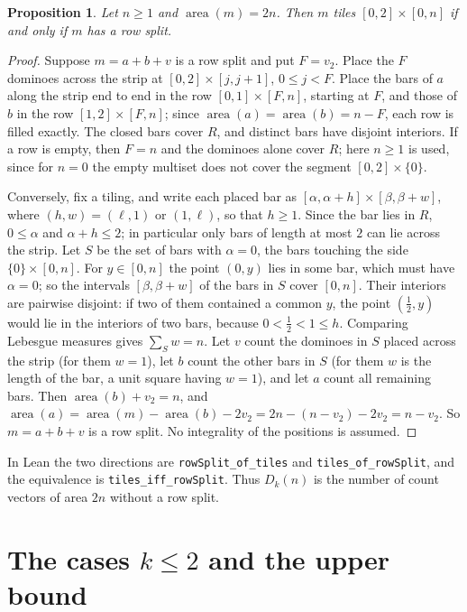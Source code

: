 \documentclass[11pt]{article}
\newtheorem{proposition}{Proposition}
\theoremstyle{definition}
\theoremstyle{remark}
\newcommand{\area}{\operatorname{area}}
\begin{document}
\begin{proposition}\label{prop:criterion}
Let $n\ge1$ and $\area(m)=2n$. Then $m$ tiles $[0,2]\times[0,n]$ if and only
if $m$ has a row split.
\end{proposition}

\begin{proof}
Suppose $m=a+b+v$ is a row split and put $F=v_2$. Place the $F$ dominoes
across the strip at $[0,2]\times[j,j+1]$, $0\le j<F$. Place the bars of $a$
along the strip end to end in the row $[0,1]\times[F,n]$, starting at $F$, and
those of $b$ in the row $[1,2]\times[F,n]$; since $\area(a)=\area(b)=n-F$,
each row is filled exactly. The closed bars cover $R$, and distinct bars have
disjoint interiors. If a row is empty, then $F=n$ and the dominoes alone cover
$R$; here $n\ge1$ is used, since for $n=0$ the empty multiset does not cover
the segment $[0,2]\times\{0\}$.

Conversely, fix a tiling, and write each placed bar as
$[\alpha,\alpha+h]\times[\beta,\beta+w]$, where $(h,w)=(\ell,1)$ or $(1,\ell)$,
so that $h\ge1$. Since the bar lies in $R$, $0\le\alpha$ and $\alpha+h\le2$;
in particular only bars of length at most $2$ can lie across the strip. Let
$S$ be the set of bars with $\alpha=0$, the bars touching the side
$\{0\}\times[0,n]$. For $y\in[0,n]$ the point $(0,y)$ lies in some bar, which
must have $\alpha=0$; so the intervals $[\beta,\beta+w]$ of the bars in $S$
cover $[0,n]$. Their interiors are pairwise disjoint: if two of them contained
a common $y$, the point $(\frac12,y)$ would lie in the interiors of two bars,
because $0<\frac12<1\le h$. Comparing Lebesgue measures gives
$\sum_{S}w=n$. Let $v$ count the dominoes in $S$ placed across the strip (for
them $w=1$), let $b$ count the other bars in $S$ (for them $w$ is the length
of the bar, a unit square having $w=1$), and let $a$ count all remaining bars.
Then $\area(b)+v_2=n$, and
$\area(a)=\area(m)-\area(b)-2v_2=2n-(n-v_2)-2v_2=n-v_2$. So
$m=a+b+v$ is a row split. No integrality of the positions is assumed.
\end{proof}

\noindent In Lean the two directions are \texttt{rowSplit\_\allowbreak of\_\allowbreak tiles}
and \texttt{tiles\_\allowbreak of\_\allowbreak rowSplit}, and the equivalence is
\texttt{tiles\_\allowbreak iff\_\allowbreak rowSplit}. Thus $D_k(n)$ is the number
of count vectors of area $2n$ without a row split.

\section{\texorpdfstring{The cases $k\le2$ and the upper bound}{The cases k <= 2 and the upper bound}}\label{sec:upper}
\end{document}
